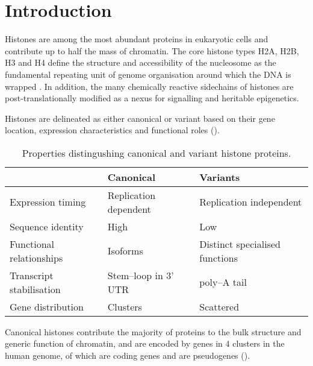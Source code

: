 \section{Introduction}

	Histones are among the most abundant proteins in eukaryotic cells 
	and contribute up to half the mass of chromatin. 
	The core histone types H2A, H2B, H3 and H4 
	define the structure and accessibility of the nucleosome 
	as the fundamental repeating unit of genome organisation 
	around which the DNA is wrapped \citep{Luger1997structure}.
	In addition, the many chemically reactive sidechains of histones 
	are post-translationally modified 
	as a nexus for signalling and heritable epigenetics.

	Histones are delineated as either canonical or variant based on 
	their gene location, expression characteristics and functional roles ().

\begin{table*}[hp]
	\caption{Properties distingushing canonical and variant histone proteins.}
	\label{tab:typical-histone-differences}
	\centering
	\begin{tabular}{l l l}
		\toprule
		\null			     & Canonical             & Variants \\
		\midrule
		Expression timing         & Replication dependent & Replication independent \\
		Sequence identity         & High			  & Low \\
		Functional relationships  & Isoforms              & Distinct specialised functions \\
		Transcript stabilisation  & Stem--loop in 3' UTR  & poly--A tail \\
		Gene distribution         & Clusters              & Scattered \\
	\bottomrule
	\end{tabular}
\end{table*}

	Canonical histones contribute the majority of proteins to 
	the bulk structure and generic function of chromatin, 
	and are encoded by \TotalGenes{} genes in 4 clusters in the human genome,
	of which \TotalCodingGenes{} are coding genes and \TotalPseudoGenes{} are pseudogenes ().

